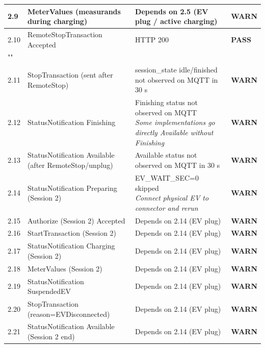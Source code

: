 \documentclass[10pt, a4paper]{article}
\begin{document}
\begin{longtable}{|L{1cm}|L{5.5cm}|M{7cm}|C{1.8cm}|}
\hline
\small 2.9 & \small MeterValues (measurands during charging) & Depends on 2.5 (EV plug / active charging) & \textcolor{warnorange}{\textbf{WARN}} \\
\hline
\small 2.10 & \small RemoteStopTransaction  Accepted & HTTP 200 & \textcolor{passgreen}{\textbf{PASS}} \\
\hline
{} \\
\hline
\small 2.11 & \small StopTransaction (sent after RemoteStop) & session\_state idle/finished not observed on MQTT in 30 s & \textcolor{warnorange}{\textbf{WARN}} \\
\hline
\small 2.12 & \small StatusNotification Finishing & Finishing status not observed on MQTT{\newline\normalfont\footnotesize\itshape Some implementations go directly Available without Finishing} & \textcolor{warnorange}{\textbf{WARN}} \\
\hline
\small 2.13 & \small StatusNotification Available (after RemoteStop/unplug) & Available status not observed on MQTT in 30 s & \textcolor{warnorange}{\textbf{WARN}} \\
\hline
\small 2.14 & \small StatusNotification Preparing (Session 2) & EV\_WAIT\_SEC=0  skipped{\newline\normalfont\footnotesize\itshape Connect physical EV to connector and rerun} & \textcolor{warnorange}{\textbf{WARN}} \\
\hline
\small 2.15 & \small Authorize (Session 2)  Accepted & Depends on 2.14 (EV plug) & \textcolor{warnorange}{\textbf{WARN}} \\
\hline
\small 2.16 & \small StartTransaction (Session 2) & Depends on 2.14 (EV plug) & \textcolor{warnorange}{\textbf{WARN}} \\
\hline
\small 2.17 & \small StatusNotification Charging (Session 2) & Depends on 2.14 (EV plug) & \textcolor{warnorange}{\textbf{WARN}} \\
\hline
\small 2.18 & \small MeterValues (Session 2) & Depends on 2.14 (EV plug) & \textcolor{warnorange}{\textbf{WARN}} \\
\hline
\small 2.19 & \small StatusNotification SuspendedEV & Depends on 2.14 (EV plug) & \textcolor{warnorange}{\textbf{WARN}} \\
\hline
\small 2.20 & \small StopTransaction (reason=EVDisconnected) & Depends on 2.14 (EV plug) & \textcolor{warnorange}{\textbf{WARN}} \\
\hline
\small 2.21 & \small StatusNotification Available (Session 2 end) & Depends on 2.14 (EV plug) & \textcolor{warnorange}{\textbf{WARN}} \\
\hline
\end{longtable}
\normalsize
\end{document}
